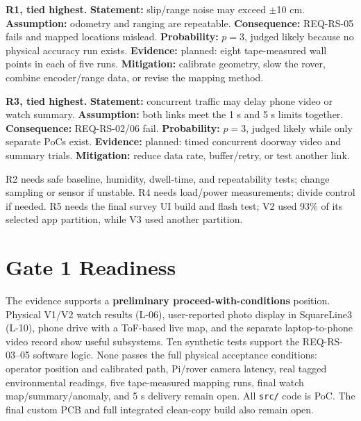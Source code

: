 \documentclass[conference,onecolumn,letterpaper]{IEEEtran}
\begin{document}
\textbf{R1, tied highest.} \textbf{Statement:} slip/range noise may exceed $\pm$10 cm. \textbf{Assumption:} odometry and ranging are repeatable. \textbf{Consequence:} REQ-RS-05 fails and mapped locations mislead. \textbf{Probability:} $p=3$, judged likely because no physical accuracy run exists. \textbf{Evidence:} planned: eight tape-measured wall points in each of five runs. \textbf{Mitigation:} calibrate geometry, slow the rover, combine encoder/range data, or revise the mapping method.

\textbf{R3, tied highest.} \textbf{Statement:} concurrent traffic may delay phone video or watch summary. \textbf{Assumption:} both links meet the 1 s and 5 s limits together. \textbf{Consequence:} REQ-RS-02/06 fail. \textbf{Probability:} $p=3$, judged likely while only separate PoCs exist. \textbf{Evidence:} planned: timed concurrent doorway video and summary trials. \textbf{Mitigation:} reduce data rate, buffer/retry, or test another link.

R2 needs safe baseline, humidity, dwell-time, and repeatability tests; change sampling or sensor if unstable. R4 needs load/power measurements; divide control if needed. R5 needs the final survey UI build and flash test; V2 used 93\% of its selected app partition, while V3 used another partition.

\section{Gate 1 Readiness}

The evidence supports a \textbf{preliminary proceed-with-conditions} position. Physical V1/V2 watch results (L-06), user-reported photo display in SquareLine3 (L-10), phone drive with a ToF-based live map, and the separate laptop-to-phone video record show useful subsystems. Ten synthetic tests support the REQ-RS-03--05 software logic. None passes the full physical acceptance conditions: operator position and calibrated path, Pi/rover camera latency, real tagged environmental readings, five tape-measured mapping runs, final watch map/summary/anomaly, and 5 s delivery remain open. All \texttt{src/} code is PoC. The final custom PCB and full integrated clean-copy build also remain open.
\end{document}

